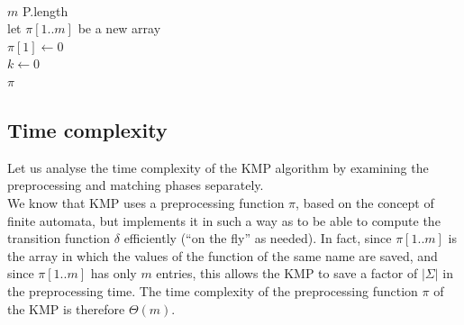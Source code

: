 \documentclass[11pt]{article}
\begin{document}
            \begin{algorithm}[H] \label{alg:compute_prefix_function}
                \SetAlgoLined
                \vspace{0.5em}
                 \\
                \vspace{0.5em}

                    $m$ \leftarrow P.length\; \\
                    let $\pi[1..m]$ be a new array\; \\
                    $\pi[1] \leftarrow 0$\; \\
                    $k \leftarrow 0$\; \\
                    \Return $\pi$\;

            \end{algorithm}

        \subsection{Time complexity} \label{subsec:kmp_time_complexity}

            Let us analyse the time complexity of the KMP algorithm by examining the preprocessing and matching phases separately. \\

            \noindent We know that KMP uses a preprocessing function $\pi$, based on the concept of finite automata,
            but implements it in such a way as to be able to compute the transition function $\delta$ efficiently (``on the fly'' as needed).
            In fact, since $\pi[1..m]$ is the array in which the values of the function of the same name are saved, and since $\pi[1..m]$ has only $m$ entries,
            this allows the KMP to save a factor of $\lvert\Sigma\rvert$ in the preprocessing time.
            The time complexity of the preprocessing function $\pi$ of the KMP is therefore $\Theta(m)$.
\end{document}
